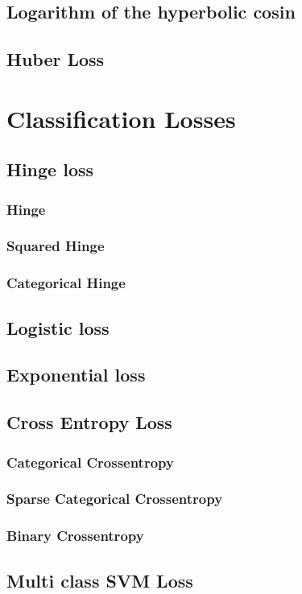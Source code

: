 \documentclass[oneside]{book}
\begin{document}
			\subsection{Logarithm of the hyperbolic cosin}
			\subsection{Huber Loss}
		\section{Classification Losses}
			\subsection{Hinge loss}
				\subsubsection{Hinge}
				\subsubsection{Squared Hinge}
				\subsubsection{Categorical Hinge}
			\subsection{Logistic loss}
			\subsection{Exponential loss}
			\subsection{Cross Entropy Loss}
				\subsubsection{Categorical Crossentropy}
				\subsubsection{Sparse Categorical Crossentropy}
				\subsubsection{Binary Crossentropy}
			\subsection{Multi class SVM Loss}
\end{document}
